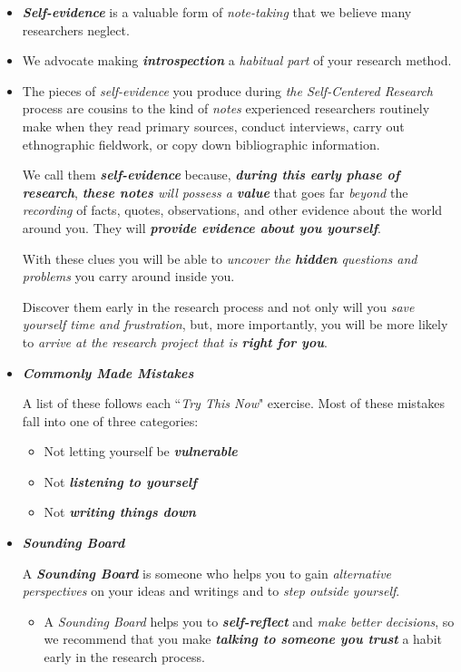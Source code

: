 \documentclass[11pt]{article}
\begin{document}
\begin{itemize}
\item \emph{\textbf{Self-evidence}} is a valuable form of \emph{note-taking} that we believe many researchers neglect.

\item We advocate making \emph{\textbf{introspection}} a \emph{habitual part} of your research method. 

\item The pieces of \emph{self-evidence} you produce during \emph{the Self-Centered Research} process are cousins to the kind of \emph{notes} experienced researchers routinely make when they read primary sources, conduct interviews, carry out ethnographic fieldwork, or copy down bibliographic information.

We call them \emph{\textbf{self-evidence}} because, \emph{\textbf{during this early phase of research}}, \emph{\textbf{these notes} will possess a \textbf{value}} that goes far \emph{beyond} the \emph{recording} of facts, quotes, observations, and other evidence about the world around you. They will \emph{\textbf{provide evidence about you yourself}}. 

With these clues you will be able to \emph{uncover the \textbf{hidden} questions and problems} you carry around inside you. 

Discover them early in the research process and not only will you \emph{save yourself time and frustration}, but, more importantly, you will be more likely to \emph{arrive at the research project that is \textbf{right for you}}.

\item \emph{\textbf{Commonly Made Mistakes}}

A list of these follows each ``\emph{Try This Now}" exercise. Most of these mistakes fall into one of three categories:
\begin{itemize}
\item Not letting yourself be \emph{\textbf{vulnerable}}
\item Not \emph{\textbf{listening to yourself}}
\item Not \emph{\textbf{writing things down}}
\end{itemize}

\item \emph{\textbf{Sounding Board}}
 
A \emph{\textbf{Sounding Board}} is someone who helps you to gain \emph{alternative perspectives} on your ideas and writings and to \emph{step outside yourself}. 
\begin{itemize}
\item A \emph{Sounding Board} helps you to \emph{\textbf{self-reflect}} and \emph{make better decisions}, so we recommend that you make \emph{\textbf{talking to someone you trust}} a habit early in the research process. 


\end{itemize}
\end{itemize}
\end{document}
